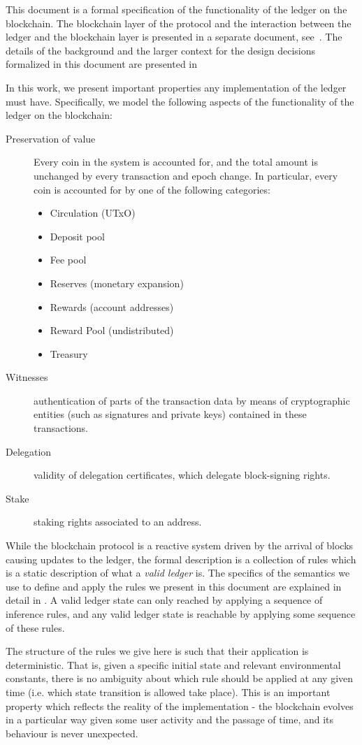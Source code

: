 This document is a formal specification of the functionality of the ledger
on the blockchain. The blockchain layer of the
protocol and the interaction between the ledger and the blockchain
layer is presented in a separate document, see~\cite{shelley_consensus}. The details of the
background and the larger context
for the design decisions formalized in this document are presented
in~\cite{delegation_design}

In this work,
we present important properties any implementation of the ledger must have.
Specifically, we model the following aspects
of the functionality of the ledger on the blockchain:

\begin{description}
\item[Preservation of value] Every coin in the system is accounted for,
  and the total amount is unchanged by every transaction and epoch change.
  In particular, every coin is accounted for by one of the following categories:
  \begin{itemize}
    \item Circulation (UTxO)
    \item Deposit pool
    \item Fee pool
    \item Reserves (monetary expansion)
    \item Rewards (account addresses)
    \item Reward Pool (undistributed)
    \item Treasury
  \end{itemize}
\item[Witnesses] authentication of parts of the transaction data by means of
  cryptographic entities (such as signatures and private keys) contained in
  these transactions.
\item[Delegation] validity of delegation certificates, which delegate
  block-signing rights.
\item[Stake] staking rights associated to an address.
\end{description}

While the blockchain protocol is a reactive system driven by the arrival
of blocks causing updates to the ledger, the formal description is a collection
of rules which is a
static description of what a \textit{valid ledger} is. The specifics of the
semantics we use to define and apply
the rules we present in this document are explained in detail in
\cite{small_step_semantics}. A valid ledger state can only
reached by applying a sequence of inference rules, and any valid ledger state
is reachable by applying some sequence of these rules.

The structure of the rules we give here is such that their application is
deterministic. That is, given a specific initial state and relevant environmental
constants, there is no ambiguity
about which rule should be applied at any given time (i.e. which state
transition is allowed take place). This is an important property which reflects
the reality of the implementation - the blockchain evolves in a particular way
given some user activity and the passage of time, and its behaviour is
never unexpected.
